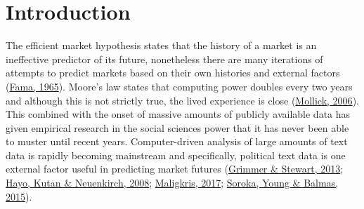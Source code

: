 \documentclass[11pt,preprint, authoryear]{elsarticle}
\numberwithin{equation}{section}
\numberwithin{figure}{section}
\numberwithin{table}{section}
\begin{document}

\headsep 35pt %




\listoffigures
\listoftables
\newpage

\hypertarget{introduction}{%
\section{\texorpdfstring{Introduction
\label{Introduction}}{Introduction }}\label{introduction}}

The efficient market hypothesis states that the history of a market is
an ineffective predictor of its future, nonetheless there are many
iterations of attempts to predict markets based on their own histories
and external factors (\protect\hyperlink{ref-famaEfficient}{Fama,
1965}). Moore's law states that computing power doubles every two years
and although this is not strictly true, the lived experience is close
(\protect\hyperlink{ref-mollick2006establishing}{Mollick, 2006}). This
combined with the onset of massive amounts of publicly available data
has given empirical research in the social sciences power that it has
never been able to muster until recent years. Computer-driven analysis
of large amounts of text data is rapidly becoming mainstream and
specifically, political text data is one external factor useful in
predicting market futures
(\protect\hyperlink{ref-grimmer2013text}{Grimmer \& Stewart, 2013};
\protect\hyperlink{ref-hayo2008communicating}{Hayo, Kutan \& Neuenkirch,
2008}; \protect\hyperlink{ref-maligkris2017political}{Maligkris, 2017};
\protect\hyperlink{ref-soroka2015bad}{Soroka, Young \& Balmas, 2015}).
\end{document}
